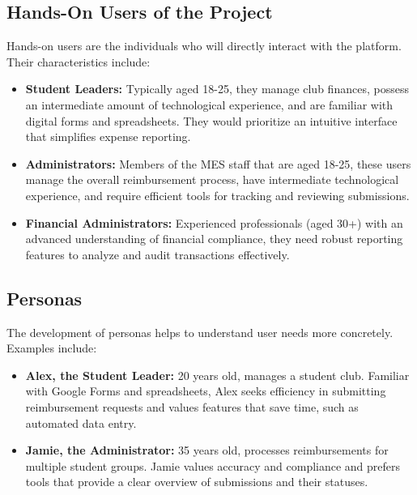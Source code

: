 \documentclass[12pt]{article}
\begin{document}
\subsection{Hands-On Users of the Project}
Hands-on users are the individuals who will directly interact with the platform. Their characteristics include:
\begin{itemize}
    \item \textbf{Student Leaders:} Typically aged 18-25, they manage club finances, possess an intermediate amount of technological experience, and are familiar with digital forms and spreadsheets. They would prioritize an intuitive interface that simplifies expense reporting.
    \item \textbf{Administrators:} Members of the MES staff that are aged 18-25, these users manage the overall reimbursement process, have intermediate technological experience, and require efficient tools for tracking and reviewing submissions.
    \item \textbf{Financial Administrators:} Experienced professionals (aged 30+) with an advanced understanding of financial compliance, they need robust reporting features to analyze and audit transactions effectively.
\end{itemize}

\subsection{Personas}
The development of personas helps to understand user needs more concretely. Examples include:
\begin{itemize}
    \item \textbf{Alex, the Student Leader:} 20 years old, manages a student club. Familiar with Google Forms and spreadsheets, Alex seeks efficiency in submitting reimbursement requests and values features that save time, such as automated data entry.
    \item \textbf{Jamie, the Administrator:} 35 years old, processes reimbursements for multiple student groups. Jamie values accuracy and compliance and prefers tools that provide a clear overview of submissions and their statuses.
\end{itemize}
\end{document}
